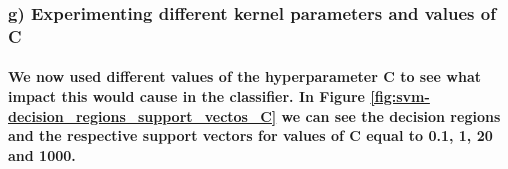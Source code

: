 \documentclass[a4paper]{article}    %
\begin{document}
\subsubsection{g) Experimenting different kernel parameters and values of C}

\paragraph{We now used different values of the hyperparameter C to see what impact this would cause in the classifier. In Figure \ref{fig:svm-decision_regions_support_vectos_C} we can see the decision regions and the respective support vectors for values of C equal to 0.1, 1, 20 and 1000.}

\end{document}
